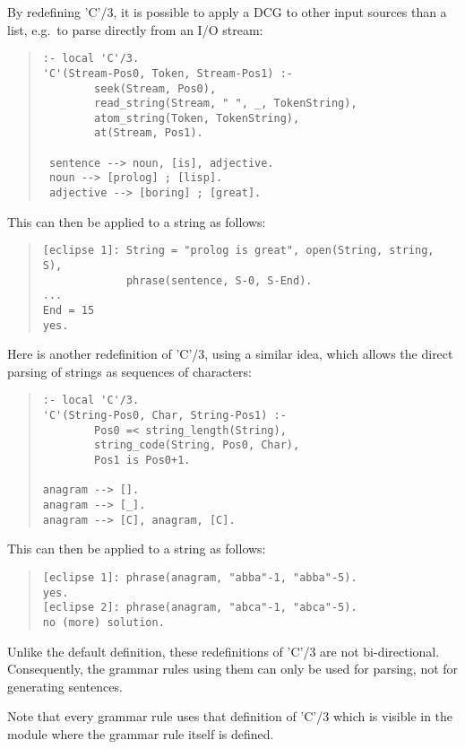 By redefining 'C'/3, it is possible to apply a DCG to other
input sources than a list, e.g.\ to parse directly from an I/O stream:
\begin{quote}\begin{verbatim}
:- local 'C'/3.
'C'(Stream-Pos0, Token, Stream-Pos1) :-
        seek(Stream, Pos0),
        read_string(Stream, " ", _, TokenString),
        atom_string(Token, TokenString),
        at(Stream, Pos1).

 sentence --> noun, [is], adjective.
 noun --> [prolog] ; [lisp].
 adjective --> [boring] ; [great].
\end{verbatim}\end{quote}
This can then be applied to a string as follows:
\begin{quote}\begin{verbatim}
[eclipse 1]: String = "prolog is great", open(String, string, S),
             phrase(sentence, S-0, S-End).
...
End = 15
yes.
\end{verbatim}\end{quote}
Here is another redefinition of 'C'/3, using a similar idea, which allows
the direct parsing of {\eclipse} strings as sequences of characters:
\begin{quote}\begin{verbatim}
:- local 'C'/3.
'C'(String-Pos0, Char, String-Pos1) :-
        Pos0 =< string_length(String),
        string_code(String, Pos0, Char),
        Pos1 is Pos0+1.

anagram --> [].
anagram --> [_].
anagram --> [C], anagram, [C].
\end{verbatim}\end{quote}
This can then be applied to a string as follows:
\begin{quote}\begin{verbatim}
[eclipse 1]: phrase(anagram, "abba"-1, "abba"-5).
yes.
[eclipse 2]: phrase(anagram, "abca"-1, "abca"-5).
no (more) solution.
\end{verbatim}\end{quote}
Unlike the default definition, these redefinitions of 'C'/3 are not bi-directional.
Consequently, the grammar rules using them can only be used for parsing,
not for generating sentences.

Note that every grammar rule uses that definition of 'C'/3 which is visible in
the module where the grammar rule itself is defined.

